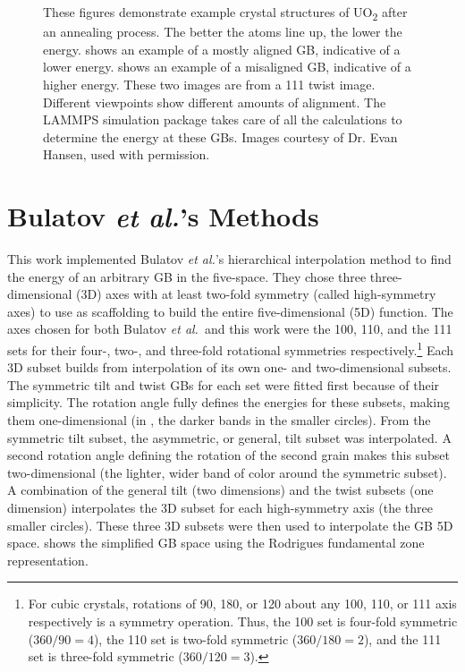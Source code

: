 \documentclass[twoside,senior]{BYUPhys}
\begin{document}
\begin{figure}[ht!]
 \caption[Example of crystal structures after annealing.]{\label{fig:lammps}These figures demonstrate example crystal structures of UO\textsubscript{2} after an annealing process.  The better the atoms line up, the lower the energy. \protect{} shows an example of a mostly aligned GB, indicative of a lower energy.  \protect{} shows an example of a misaligned GB, indicative of a higher energy.  These two images are from a \textlangle{}111\textrangle{} twist image.  Different viewpoints show different amounts of alignment.  The LAMMPS simulation package takes care of all the calculations to determine the energy at these GBs. Images courtesy of Dr. Evan Hansen, used with permission.}
\end{figure}

\section{Bulatov \emph{et al.}'s Methods\label{methods:bulatov}}
This work implemented Bulatov \emph{et al.}'s hierarchical interpolation method to find the energy of an arbitrary GB in the five-space.\cite{bulatov2014}  They chose three three-dimensional (3D) axes with at least two-fold symmetry (called high-symmetry axes) to use as scaffolding to build the entire five-dimensional (5D) function.  The axes chosen for both Bulatov \emph{et al.}\ and this work were the \textlangle{}100\textrangle{}, \textlangle{}110\textrangle{}, and the \textlangle{}111\textrangle{} sets for their four-, two-, and three-fold rotational symmetries respectively.\footnote{For cubic crystals, rotations of 90\textdegree{}, 180\textdegree{}, or 120\textdegree{} about any \textlangle{}100\textrangle{}, \textlangle{}110\textrangle{}, or \textlangle{}111\textrangle{} axis respectively is a symmetry operation.\cite{stokes2007}  Thus, the \textlangle{}100\textrangle{} set is four-fold symmetric (360\textdegree{}$/90$\textdegree{}$=4$), the \textlangle{}110\textrangle{} set is two-fold symmetric (360\textdegree{}$/180$\textdegree{}$=2$), and the \textlangle{}111\textrangle{} set is three-fold symmetric (360\textdegree{}$/120$\textdegree{}$=3$).}  Each 3D subset builds from interpolation of its own one- and two-dimensional subsets.  The symmetric tilt and twist GBs for each set were fitted first because of their simplicity.  The rotation angle fully defines the energies for these subsets, making them one-dimensional (in , the darker bands in the smaller circles).  From the symmetric tilt subset, the asymmetric, or general, tilt subset was interpolated.  A second rotation angle defining the rotation of the second grain makes this subset two-dimensional (the lighter, wider band of color around the symmetric subset).  A combination of the general tilt (two dimensions) and the twist subsets (one dimension) interpolates the 3D subset for each high-symmetry axis (the three smaller circles).  These three 3D subsets were then used to interpolate the GB 5D space.  shows the simplified GB space using the Rodrigues fundamental zone representation.  
\end{document}
